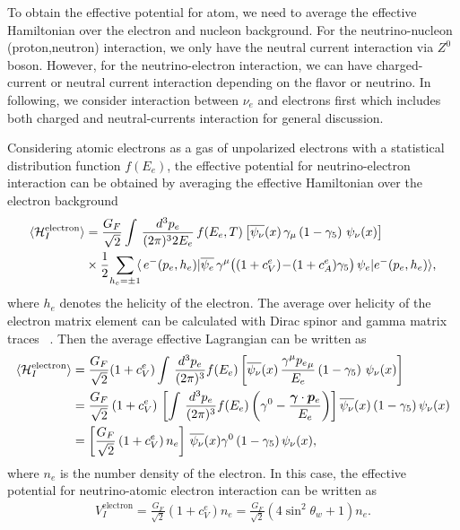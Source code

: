 To obtain the effective potential for atom, we need to average the effective Hamiltonian over the electron and nucleon background. For the neutrino-nucleon (proton,neutron) interaction, we only have the neutral current interaction via $Z^0$ boson. However, for the neutrino-electron interaction, we can have charged-current or neutral current interaction depending on the flavor or neutrino. In following, we consider interaction between $\nu_e$ and electrons first which includes both charged and neutral-currents interaction for general discussion.

Considering atomic electrons as a gas of unpolarized electrons with a statistical distribution function $f(E_e)$, the effective potential for neutrino-electron interaction can be obtained by averaging the effective Hamiltonian over the electron background~\cite{Giunti:2007ry}
\begin{align}
\langle{\mathcal{H}^\mathrm{electron}_{I}}\rangle&=\frac{G_F}{\sqrt{2}}\int\,\frac{d^3p_e}{(2\pi)^32E_e}\,f(E_e,T)\left[\overline{\psi_\nu}(x)\,\gamma_\mu\left(1-\gamma_5\right)\,\psi_\nu(x)\right]\notag\\&\times\frac{1}{2}\!\sum_{h_e=\pm1}\!\!\langle\,e^-(p_e,h_e)|\overline{\psi_e}\,\gamma^\mu\big((1+c^e_V)\!-\!(1+c^e_A)\gamma_5\big)\,\psi_e|e^-(p_e,h_e)\rangle,
\end{align}
where $h_e$ denotes the helicity of the electron. The average over helicity of the electron matrix element can be calculated with Dirac spinor and gamma matrix traces ~\cite{Giunti:2007ry}. Then the average effective Lagrangian can be written as
\begin{align}
\langle{\mathcal{H}^\mathrm{electron}_{I}}\rangle&=\frac{G_F}{\sqrt{2}}(1+c^e_V)\int\,\frac{d^3p_e}{(2\pi)^3}f(E_e)\left[\overline{\psi_\nu}(x)\,\frac{\gamma^\mu{p_e}_\mu}{E_e}\left(1-\gamma_5\right)\,\psi_\nu(x)\right]\notag\\
&=\frac{G_F}{\sqrt{2}}\,(1+c^e_V)\,\left[\int\,\frac{d^3p_e}{(2\pi)^3}f(E_e)\left(\gamma^0-\frac{\vec{\gamma}\cdot\vec{{p}}_e}{E_e}\right)\right]\overline{\psi_\nu}(x)\left(1-\gamma_5\right)\psi_\nu(x)\notag\\
&=\left[\frac{G_F}{\sqrt{2}}\left(1+c^e_V\right)n_{e}\right]\,\overline{\psi_\nu}(x)\gamma^0\left(1-\gamma_5\right)\psi_\nu(x),
\end{align}
where $n_e$ is the number density of the electron. In this case, the effective potential for neutrino-atomic electron interaction can be written as
\begin{align}
V^{\mathrm{electron}}_{I}=\frac{G_F}{\sqrt{2}}\left(1+c^e_V\right)n_{e}=\frac{G_F}{\sqrt{2}}\left(4\sin^2\theta_w+1\right)n_{e}.
\end{align}
